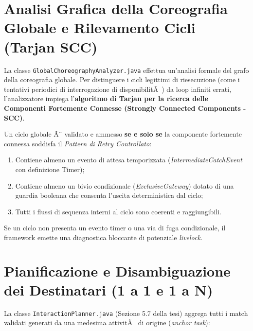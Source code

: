 ﻿\documentclass[11pt, a4paper]{report}
\begin{document}
\section{Analisi Grafica della Coreografia Globale e Rilevamento Cicli (Tarjan SCC)}

La classe \texttt{GlobalChoreographyAnalyzer.java} effettua un'analisi formale del grafo della coreografia globale. Per distinguere i cicli legittimi di riesecuzione (come i tentativi periodici di interrogazione di disponibilitÃ ) da loop infiniti errati, l'analizzatore impiega l'\textbf{algoritmo di Tarjan per la ricerca delle Componenti Fortemente Connesse (Strongly Connected Components - SCC)}.

Un ciclo globale Ã¨ validato e ammesso \textbf{se e solo se} la componente fortemente connessa soddisfa il \textit{Pattern di Retry Controllato}:
\begin{enumerate}
    \item Contiene almeno un evento di attesa temporizzata (\textit{IntermediateCatchEvent} con definizione Timer);
    \item Contiene almeno un bivio condizionale (\textit{ExclusiveGateway}) dotato di una guardia booleana che consenta l'uscita deterministica dal ciclo;
    \item Tutti i flussi di sequenza interni al ciclo sono coerenti e raggiungibili.
\end{enumerate}

Se un ciclo non presenta un evento timer o una via di fuga condizionale, il framework emette una diagnostica bloccante di potenziale \textit{livelock}.

\section{Pianificazione e Disambiguazione dei Destinatari (1 a 1 e 1 a N)}

La classe \texttt{InteractionPlanner.java} (Sezione 5.7 della tesi) aggrega tutti i match validati generati da una medesima attivitÃ  di origine (\textit{anchor task}):
\end{document}
